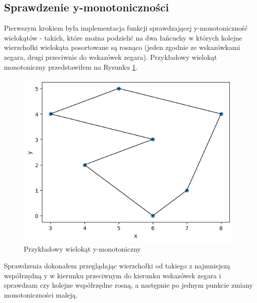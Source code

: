 \documentclass[a4paper]{article}
\begin{document}
    \subsection{Sprawdzenie y-monotoniczności}
    Pierwszym krokiem była implementacja funkcji sprawdzającej y-monotoniczność wielokątów - 
    takich, które można podzielić na dwa łańcuchy w których kolejne wierzchołki wielokąta posortowane
    są rosnąco (jeden zgodnie ze wskazówkami zegara, drugi przeciwnie do wskazówek zegara). Przykładowy 
    wielokąt monotoniczny przedstawiłem na Rysunku \ref{fig:example_monotone}.
    \begin{figure}[H]
        \centering
        \includegraphics{przykladowy_y_monotoniczny.png}
        \caption{Przykładowy wielokąt y-monotoniczny}
        \label{fig:example_monotone}
    \end{figure}
    \noindent Sprawdzenia dokonałem przeglądając wierzchołki od takiego z najmniejszą współrzędną y
    w kierunku przeciwnym do kierunku wskazówek zegara i sprawdzam czy kolejne współrzędne rosną,
    a następnie po jednym punkcie zmiany monotoniczności maleją.
\end{document}
